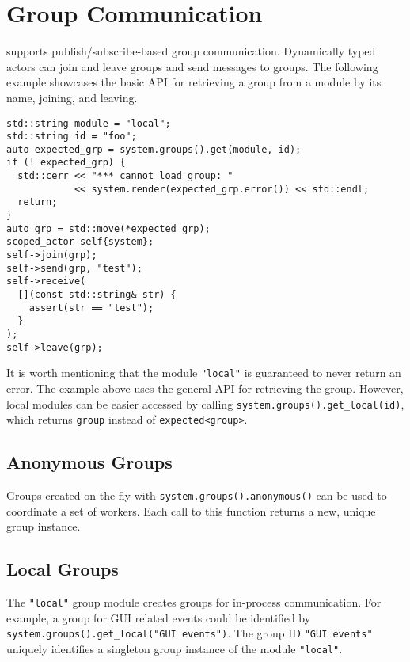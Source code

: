 \section{Group Communication}
\label{groups}

\lib supports publish/subscribe-based group communication. Dynamically typed
actors can join and leave groups and send messages to groups. The following
example showcases the basic API for retrieving a group from a module by its
name, joining, and leaving.

\begin{lstlisting}
std::string module = "local";
std::string id = "foo";
auto expected_grp = system.groups().get(module, id);
if (! expected_grp) {
  std::cerr << "*** cannot load group: "
            << system.render(expected_grp.error()) << std::endl;
  return;
}
auto grp = std::move(*expected_grp);
scoped_actor self{system};
self->join(grp);
self->send(grp, "test");
self->receive(
  [](const std::string& str) {
    assert(str == "test");
  }
);
self->leave(grp);
\end{lstlisting}

It is worth mentioning that the module \lstinline`"local"` is guaranteed to
never return an error. The example above uses the general API for retrieving
the group. However, local modules can be easier accessed by calling
\lstinline`system.groups().get_local(id)`, which returns \lstinline`group`
instead of \lstinline`expected<group>`.

\subsection{Anonymous Groups}
\label{anonymous-group}

Groups created on-the-fly with \lstinline^system.groups().anonymous()^ can be
used to coordinate a set of workers. Each call to this function returns a new,
unique group instance.

\subsection{Local Groups}
\label{local-group}

The \lstinline^"local"^ group module creates groups for in-process
communication. For example, a group for GUI related events could be identified
by \lstinline^system.groups().get_local("GUI events")^. The group ID
\lstinline^"GUI events"^ uniquely identifies a singleton group instance of the
module \lstinline^"local"^.

